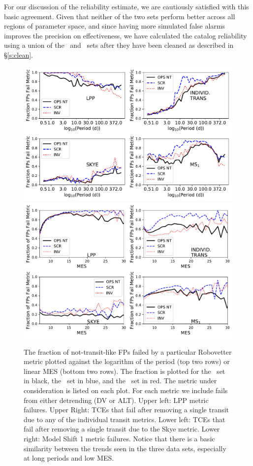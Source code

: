 For our discussion of the reliability estimate, we are cautiously satisfied with this basic agreement. Given that neither of the two sets perform better across all regions of parameter space, and since having more simulated false alarms improves the precision on effectiveness,  we have calculated the catalog reliability using a union of the \scrtce\ and \invtce\ sets after they have been cleaned as described in \S\ref{s:clean}.  



\begin{figure}[hp]
    \centering
    \includegraphics[width=0.85\linewidth]{f6-top.pdf}
    \includegraphics[width=0.85\linewidth]{f6-bottom.pdf}
    \caption{The fraction of not-transit-like FPs failed by a particular Robovetter metric plotted against the logarithm of the period (top two rows) or linear MES (bottom two rows).  The fraction is plotted for the \opstce\ set in black, the \scrtce\ set in blue, and the \invtce\ set in red. The metric under consideration is listed on each plot.  For each metric we include fails from either detrending (DV or ALT). Upper left: LPP metric failures. Upper Right: TCEs that fail after removing a single transit due to any of the individual transit metrics.  Lower left: TCEs that fail after removing a single transit due to the Skye metric. Lower right: Model Shift 1 metric failures. Notice that there is a basic similarity between the trends seen in the three data sets, especially at long periods and low MES.}
    \label{f:fractionFailMetric}
\end{figure}

